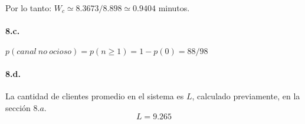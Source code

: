 \documentclass{article}
\begin{document}
      Por lo tanto: $W_c \simeq 8.3673 / 8.898 \simeq 0.9404$ minutos.


   \paragraph{8.c.} $p(canal\:no\:ocioso) = p(n \ge 1) = 1 - p(0) = 88/98$

   \paragraph{8.d.} La cantidad de clientes promedio en el sistema es $L$, calculado previamente, en la sección $8.a$.
      $$L = 9.265$$
\end{document}

